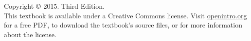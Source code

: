 \chapter*{}
\vfill

\noindent Copyright $\copyright$ 2015. Third Edition. \\

\noindent This textbook is available under a Creative Commons license. Visit \href{http://www.openintro.org/stat/textbook.php}{openintro.org} for a free PDF, to download the textbook's source files, or for more information about the license. \\


